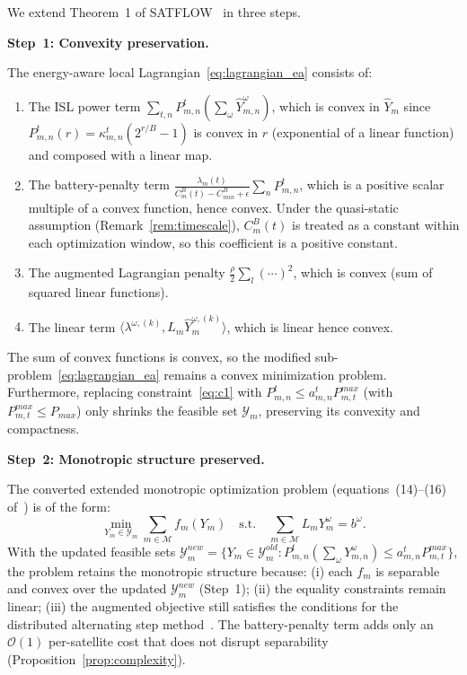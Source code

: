 \documentclass[journal]{IEEEtran}
\newcommand{\CB}{C^{B}}
\newcommand{\CBmin}{C^{B}_{min}}
\newcommand{\Pmax}{P_{max}}
\newcommand{\calM}{\mathcal{M}}
\begin{document}
\begin{IEEEproof}
We extend Theorem~1 of SATFLOW~\cite{cen2024satflow} in three steps.

\smallskip
\noindent\textbf{Step~1: Convexity preservation.}

The energy-aware local Lagrangian~\eqref{eq:lagrangian_ea} consists of:
\begin{enumerate}
    \item The ISL power term
$\sum_{t,n} P_{m,n}^t(\sum_\omega
    \hat{Y}_{m,n}^\omega)$, which is convex in
$\hat{Y}_m$ since $P_{m,n}^t(r) = \kappa_{m,n}^t(2^{r/B}-1)$ is convex in $r$ (exponential of a linear function) and composed with a linear map.
    \item The battery-penalty term
$\frac{\lambda_m(t)}{\CB_m(t)-\CBmin+\epsilon}
    \sum_n P_{m,n}^t$, which is a positive scalar
multiple of a convex function, hence convex. Under the quasi-static assumption (Remark~\ref{rem:timescale}), $\CB_m(t)$ is treated as a constant within each optimization window, so this coefficient is a positive constant.
    \item The augmented Lagrangian penalty
$\frac{\rho}{2}\sum_l(\cdots)^2$, which is convex (sum of squared linear functions).
    \item The linear term
$\langle\lambda^{\omega,(k)}, L_m\hat{Y}_m^{\omega,(k)}\rangle$, which is linear hence convex.
\end{enumerate}
The sum of convex functions is convex, so the modified sub-problem~\eqref{eq:lagrangian_ea} remains a convex minimization problem. Furthermore, replacing constraint~\eqref{eq:c1} with $P_{m,n}^t \leq a_{m,n}^t P_{m,t}^{max}$ (with $P_{m,t}^{max} \leq \Pmax$) only shrinks the feasible set $\mathcal{Y}_m$, preserving its convexity and compactness.

\smallskip
\noindent\textbf{Step~2: Monotropic structure
preserved.}

The converted extended monotropic optimization problem (equations~(14)--(16) of~\cite{cen2024satflow}) is of the form:
\begin{equation}
    \min_{Y_m \in \mathcal{Y}_m}
    \sum_{m\in\calM} f_m(Y_m)
    \quad \text{s.t.} \quad
    \sum_{m\in\calM} L_m Y_m^\omega = b^\omega.
\end{equation}
With the updated feasible sets $\mathcal{Y}_m^{new} = \{Y_m \in \mathcal{Y}_m^{old} : P_{m,n}^t(\sum_\omega Y_{m,n}^\omega)
\leq a_{m,n}^t P_{m,t}^{max}\}$, the problem
retains the monotropic structure because: (i) each $f_m$ is separable and convex over the updated $\mathcal{Y}_m^{new}$ (Step~1); (ii) the equality constraints remain linear; (iii) the augmented objective still satisfies the conditions for the distributed alternating step method~\cite{cen2024satflow}. The battery-penalty term adds only an $\mathcal{O}(1)$ per-satellite cost that does not disrupt separability (Proposition~\ref{prop:complexity}).


\end{IEEEproof}
\end{document}

